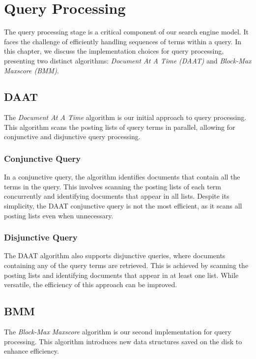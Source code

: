 \chapter{Query Processing}

The query processing stage is a critical component of our search engine model. It faces the challenge of efficiently handling 
sequences of terms within a query. In this chapter, we discuss the implementation choices for query processing, presenting two 
distinct algorithms: \textit{Document At A Time (DAAT)} and \textit{Block-Max Maxscore (BMM)}.

\section{DAAT}

The \textit{Document At A Time} algorithm is our initial approach to query processing. This algorithm scans the posting lists of 
query terms in parallel, allowing for conjunctive and disjunctive query processing.

\subsection{Conjunctive Query}

In a conjunctive query, the algorithm identifies documents that contain all the terms in the query. This involves scanning the 
posting lists of each term concurrently and identifying documents that appear in all lists. Despite its simplicity, the DAAT 
conjunctive query is not the most efficient, as it scans all posting lists even when unnecessary.

\subsection{Disjunctive Query}

The DAAT algorithm also supports disjunctive queries, where documents containing any of the query terms are retrieved. 
This is achieved by scanning the posting lists and identifying documents that appear in at least one list. While versatile, 
the efficiency of this approach can be improved.

\section{BMM}

The \textit{Block-Max Maxscore} algorithm is our second implementation for query processing. This algorithm introduces new 
data structures saved on the disk to enhance efficiency.

